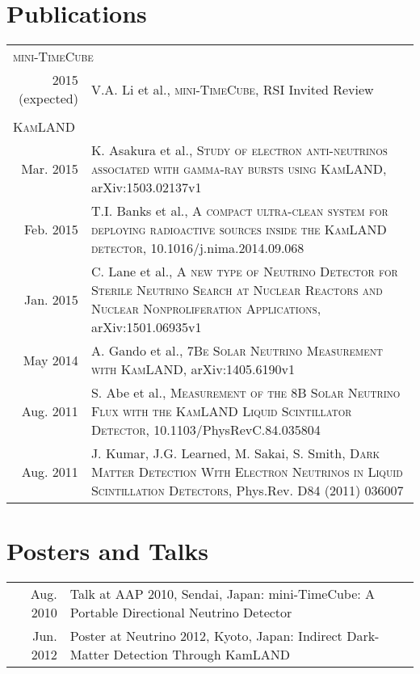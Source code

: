 \documentclass[a4paper,10pt]{article} %
\begin{document}
\section{Publications}

\begin{tabular}{rp{11cm}}
	\multicolumn{2}{l}{\textsc{mini-TimeCube}} \\
	2015 (expected) & V.A. Li et al., \textsc{mini-TimeCube}, RSI Invited Review\\
	\multicolumn{2}{c}{} \\
	\multicolumn{2}{l}{\textsc{KamLAND}} \\
	Mar. 2015 & K. Asakura et al., \textsc{Study of electron anti-neutrinos
	associated with gamma-ray bursts using KamLAND}, arXiv:1503.02137v1\\
	Feb. 2015 & T.I. Banks et al., \textsc{A compact ultra-clean system for
	deploying radioactive sources inside the KamLAND detector},
	10.1016/j.nima.2014.09.068\\
	Jan. 2015 & C. Lane et al., \textsc{A new type of Neutrino Detector for
	Sterile Neutrino Search at Nuclear Reactors and Nuclear Nonproliferation
	Applications}, arXiv:1501.06935v1\\
	May 2014 & A. Gando et al., \textsc{7Be Solar Neutrino Measurement with
	KamLAND}, arXiv:1405.6190v1\\
	Aug. 2011 & S. Abe et al., \textsc{Measurement of the 8B Solar Neutrino
	Flux with the KamLAND Liquid Scintillator Detector},
	10.1103/PhysRevC.84.035804\\
	Aug. 2011 & J. Kumar, J.G. Learned, M. Sakai, S. Smith,
	\textsc{Dark Matter Detection With Electron Neutrinos in Liquid
	Scintillation Detectors}, Phys.Rev. D84 (2011) 036007\\
\end{tabular}



\section{Posters and Talks}
\begin{tabular}{rp{11cm}}
	Aug. 2010 & Talk at AAP 2010, Sendai, Japan: mini-TimeCube: A Portable
	Directional Neutrino Detector\\
	Jun. 2012 & Poster at Neutrino 2012, Kyoto, Japan: Indirect Dark-Matter
	Detection Through KamLAND\\
\end{tabular}

\end{document}
